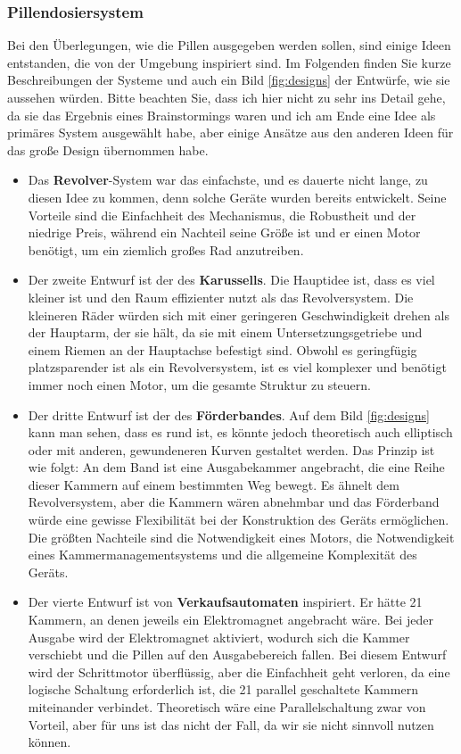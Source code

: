 \subsubsection{Pillendosiersystem}
Bei den Überlegungen, wie die Pillen ausgegeben werden sollen, sind einige Ideen entstanden, die von der Umgebung inspiriert sind. Im Folgenden finden Sie kurze Beschreibungen der Systeme und auch ein Bild \ref{fig:designs} der Entwürfe, wie sie aussehen würden. Bitte beachten Sie, dass ich hier nicht zu sehr ins Detail gehe, da sie das Ergebnis eines Brainstormings waren und ich am Ende eine Idee als primäres System ausgewählt habe, aber einige Ansätze aus den anderen Ideen für das große Design übernommen habe.
\begin{itemize}
	\item  Das \textbf{Revolver}-System war das einfachste, und es dauerte nicht lange, zu diesen Idee zu kommen, denn solche Geräte wurden bereits entwickelt\cite{LiveFinePillDispenser}. Seine Vorteile sind die Einfachheit des Mechanismus, die Robustheit und der niedrige Preis, während ein Nachteil seine Größe ist und er einen Motor benötigt, um ein ziemlich großes Rad anzutreiben.
	\item Der zweite Entwurf ist der des \textbf{Karussells}. Die Hauptidee ist, dass es viel kleiner ist und den Raum effizienter nutzt als das Revolversystem. Die kleineren Räder würden sich mit einer geringeren Geschwindigkeit drehen als der Hauptarm, der sie hält, da sie mit einem Untersetzungsgetriebe und einem Riemen an der Hauptachse befestigt sind. Obwohl es geringfügig platzsparender ist als ein Revolversystem, ist es viel komplexer und benötigt immer noch einen Motor, um die gesamte Struktur zu steuern.
	\item Der dritte Entwurf ist der des \textbf{Förderbandes}. Auf dem Bild \ref{fig:designs} kann man sehen, dass es rund ist, es könnte jedoch theoretisch auch elliptisch oder mit anderen, gewundeneren Kurven gestaltet werden. Das Prinzip ist wie folgt: An dem Band ist eine Ausgabekammer angebracht, die eine Reihe dieser Kammern auf einem bestimmten Weg bewegt. Es ähnelt dem Revolversystem, aber die Kammern wären abnehmbar und das Förderband würde eine gewisse Flexibilität bei der Konstruktion des Geräts ermöglichen. Die größten Nachteile sind die Notwendigkeit eines Motors, die Notwendigkeit eines Kammermanagementsystems und die allgemeine Komplexität des Geräts.
	\item Der vierte Entwurf ist von \textbf{Verkaufsautomaten} inspiriert. Er hätte 21 Kammern, an denen jeweils ein Elektromagnet angebracht wäre. Bei jeder Ausgabe wird der Elektromagnet aktiviert, wodurch sich die Kammer verschiebt und die Pillen auf den Ausgabebereich fallen. Bei diesem Entwurf wird der Schrittmotor überflüssig, aber die Einfachheit geht verloren, da eine logische Schaltung erforderlich ist, die 21 parallel geschaltete Kammern miteinander verbindet. Theoretisch wäre eine Parallelschaltung zwar von Vorteil, aber für uns ist das nicht der Fall, da wir sie nicht sinnvoll nutzen können.
\end{itemize}
